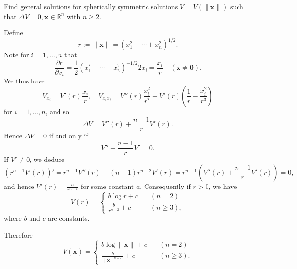 \begin{pro}
  Find general solutions for spherically symmetric solutions
  $V = V(\|\mathbf{x}\|)$ such that $\Delta V=0,
  \mathbf{x}\in\mathbb{R}^n$ with $n\geq 2$.
\end{pro}

\begin{sol}
  Define
  \begin{displaymath}
    r := \|\mathbf{x}\| = (x_1^2 + \cdots + x_n^2)^{1/2}.
  \end{displaymath}
  Note for $i=1, \ldots, n$ that
  \begin{displaymath}
    \frac{\partial r}{\partial x_i} = \frac{1}{2}(x_1^2+\cdots +
    x_n^2)^{-1/2}2x_i = \frac{x_i}{r} \quad (\mathbf{x}\neq \mathbf{0}).
  \end{displaymath}
  We thus have
  \begin{displaymath}
    V_{x_i} = V'(r)\frac{x_i}{r}, \quad
    V_{x_ix_i} = V''(r)\frac{x_i^2}{r^2} + V'(r)\left( \frac{1}{r} -
    \frac{x_i^2}{r^3}\right)
\end{displaymath}
for $i=1, \ldots, n$, and so
\begin{displaymath}
  \Delta V = V''(r) + \frac{n-1}{r}V'(r).
\end{displaymath}
Hence $\Delta V =0$ if and only if
\begin{displaymath}
  V'' + \frac{n-1}{r}V' = 0.
\end{displaymath}
If $V'\neq 0$, we deduce
\begin{displaymath}
  \left(r^{n-1}V'(r)\right)' = r^{n-1}V''(r) + (n-1)r^{n-2}V'(r)
  = r^{n-1}\left( V''(r) + \frac{n-1}{r}V'(r)\right) = 0,
\end{displaymath}
and hence $V'(r) = \frac{a}{r^{n-1}}$ for some constant $a$.
Consequently if $r>0$,
we have
\begin{displaymath}
  V(r) =
  \begin{cases}
    b\log r + c \quad &(n=2) \\
    \frac{b}{r^{n-2}} + c \quad &(n\ge 3),
  \end{cases}
\end{displaymath}
where $b$ and $c$ are constants.

Therefore
\begin{equation}
  V(\mathbf{x}) =
  \begin{cases}
    b\log\|\mathbf{x}\| + c \quad &(n=2) \\
    \frac{b}{\|\mathbf{x}\|^{n-2}} + c \quad &(n\geq 3).
  \end{cases}
\end{equation}
\end{sol}
